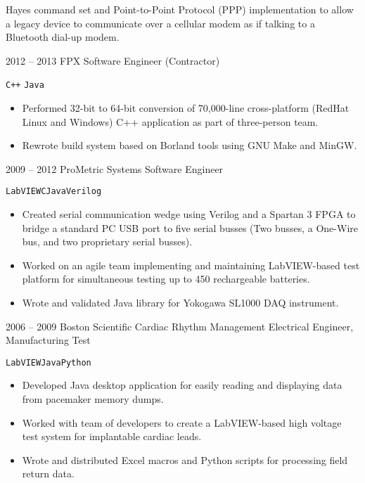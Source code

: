 \documentclass[10pt, letterpaper]{developercv}
\begin{document}
\begin{entrylist}
{\begin{itemize}[nosep]
                    Hayes command set and Point-to-Point Protocol (PPP)
                    implementation to allow a legacy device to communicate over
                    a cellular modem as if talking to a Bluetooth dial-up
                    modem.
            \end{itemize}
        }
    \entry
        {2012 -- 2013}
        {FPX}
        {Software Engineer (Contractor)}
        {%
            \texttt{C++}\slashsep
            \texttt{Java}
            \begin{itemize}[nosep]
                \item Performed 32-bit to 64-bit conversion of 70,000-line
                    cross-platform (RedHat Linux and Windows) C++ application
                    as part of three-person team.
                \item Rewrote build system based on Borland tools using GNU
                    Make and MinGW.
            \end{itemize}
        }
    \entry
        {2009 -- 2012}
        {ProMetric Systems}
        {Software Engineer}
        {%
            \texttt{LabVIEW}\slashsep\texttt{C}\slashsep\texttt{Java}\slashsep\texttt{Verilog}
            \begin{itemize}[nosep]
                \item Created serial communication wedge using Verilog and a
                    Spartan 3 FPGA to bridge a standard PC USB port to five
                    serial busses (Two \iic{} busses, a One-Wire bus, and two
                    proprietary serial busses).
                \item Worked on an agile team implementing and maintaining
                    LabVIEW-based test platform for simultaneous testing up to
                    450 rechargeable batteries.
                \item Wrote and validated Java library for Yokogawa SL1000 DAQ
                    instrument.
            \end{itemize}
        }
    \entry
        {2006 -- 2009}
        {Boston Scientific Cardiac Rhythm Management}
        {Electrical Engineer, Manufacturing Test}
        {%
            \texttt{LabVIEW}\slashsep\texttt{Java}\slashsep\texttt{Python}
            \begin{itemize}[nosep]
                \item Developed Java desktop application for easily reading and
                    displaying data from pacemaker memory dumps.
                \item Worked with team of developers to create a LabVIEW-based
                    high voltage test system for implantable cardiac leads.
                \item Wrote and distributed Excel macros and Python scripts for
                    processing field return data.
            \end{itemize}
        }
\end{entrylist}
\end{document}
